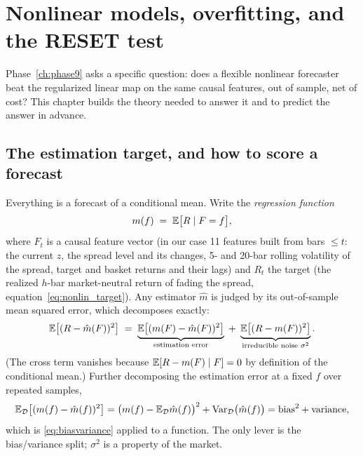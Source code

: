 \section{Nonlinear models, overfitting, and the RESET test}
\label{ch:nonlinear}

Phase~\ref{ch:phase9} asks a specific question: does a flexible nonlinear forecaster beat
the regularized linear map on the same causal features, out of sample, net of cost? This
chapter builds the theory needed to answer it and to predict the answer in advance.

\subsection{The estimation target, and how to score a forecast}
\label{sec:nonlinear:target}

Everything is a forecast of a conditional mean. Write the \emph{regression function}
\begin{equation}
  m(f) \;=\; \mathbb{E}\bigl[R \mid F=f\bigr],
  \label{eq:regressionfunction}
\end{equation}
where $F_t$ is a causal feature vector (in our case 11 features built from bars
$\le t$: the current $z$, the spread level and its changes, 5- and 20-bar rolling
volatility of the spread, target and basket returns and their lags) and $R_t$ the target
(the realized $h$-bar market-neutral return of fading the spread,
equation~\eqref{eq:nonlin_target}). Any estimator $\hat m$ is judged by its
out-of-sample mean squared error, which decomposes exactly:
\begin{equation}
  \mathbb{E}\bigl[(R-\hat m(F))^2\bigr]
  \;=\; \underbrace{\mathbb{E}\bigl[(m(F)-\hat m(F))^2\bigr]}_{\text{estimation error}}
  \;+\; \underbrace{\mathbb{E}\bigl[(R-m(F))^2\bigr]}_{\text{irreducible noise } \sigma^2} .
  \label{eq:mse:decomp}
\end{equation}
(The cross term vanishes because $\mathbb{E}[R-m(F)\mid F]=0$ by definition of the conditional
mean.) Further decomposing the estimation error at a fixed $f$ over repeated samples,
\[
  \mathbb{E}_{\mathcal D}\bigl[(m(f)-\hat m(f))^2\bigr]
  = \bigl(m(f)-\mathbb{E}_{\mathcal D}\hat m(f)\bigr)^2 + \operatorname{Var}_{\mathcal D}\bigl(\hat m(f)\bigr)
  = \mathrm{bias}^2 + \mathrm{variance},
\]
which is \eqref{eq:biasvariance} applied to a function. The only lever is the
bias/variance split; $\sigma^2$ is a property of the market.

